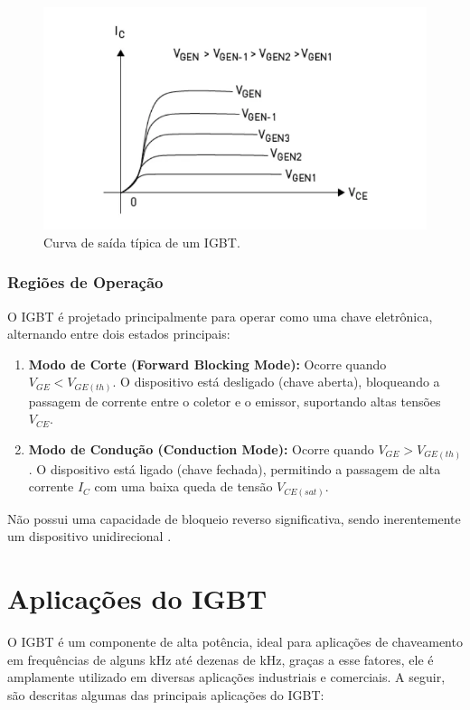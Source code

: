 \documentclass[12pt]{article}
\begin{document}
        \begin{figure}[!h]
            \centering
            \includegraphics[width=0.6\linewidth]{images/curva_de_saida.png}
            \caption{Curva de saída típica de um IGBT.}
            \label{fig:igbt_output}
        \end{figure}

        \subsubsection{Regiões de Operação}
        O IGBT é projetado principalmente para operar como uma chave eletrônica, alternando entre dois estados principais:
        \begin{enumerate}
            \item \textbf{Modo de Corte (Forward Blocking Mode):} Ocorre quando $V_{GE} < V_{GE(th)}$. O dispositivo está desligado (chave aberta), bloqueando a passagem de corrente entre o coletor e o emissor, suportando altas tensões $V_{CE}$.
            \item \textbf{Modo de Condução (Conduction Mode):} Ocorre quando $V_{GE} > V_{GE(th)}$. O dispositivo está ligado (chave fechada), permitindo a passagem de alta corrente $I_C$ com uma baixa queda de tensão $V_{CE(sat)}$.
        \end{enumerate}
        Não possui uma capacidade de bloqueio reverso significativa, sendo inerentemente um dispositivo unidirecional \cite{mps_igbt}.

        \section*{Aplicações do IGBT}

        O IGBT é um componente de alta potência, ideal para aplicações de chaveamento em frequências de alguns kHz até dezenas de kHz, graças a esse fatores, ele é amplamente utilizado em diversas aplicações industriais e comerciais. A seguir, são descritas algumas das principais aplicações do IGBT:
\end{document}
